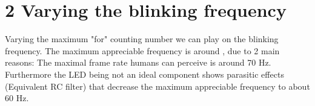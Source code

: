 \documentclass[12pt]{article}
\begin{document}
\section*{2 Varying the blinking frequency}

Varying the maximum "for" counting number we can play on the blinking frequency.
The maximum appreciable frequency is around , due to 2 main reasons:
The maximal frame rate humans can perceive is around 70 Hz. Furthermore the LED being not an ideal component shows parasitic effects (Equivalent RC filter) that decrease the maximum appreciable frequency to about 60 Hz. 
\end{document}
